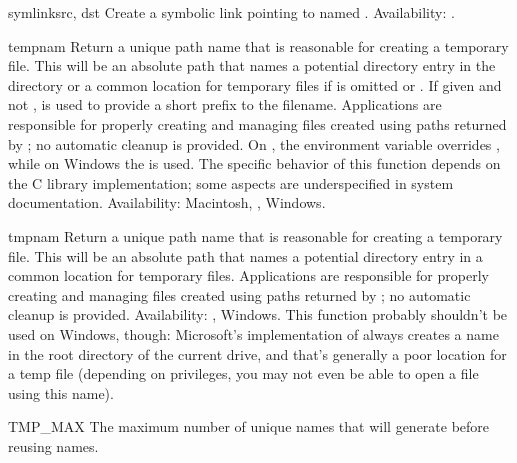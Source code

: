 \begin{funcdesc}{symlink}{src, dst}
Create a symbolic link pointing to  named .
Availability: \UNIX.
\end{funcdesc}

\begin{funcdesc}{tempnam}{}
Return a unique path name that is reasonable for creating a temporary
file.  This will be an absolute path that names a potential directory
entry in the directory  or a common location for temporary
files if  is omitted or .  If given and not
,  is used to provide a short prefix to the
filename.  Applications are responsible for properly creating and
managing files created using paths returned by ;
no automatic cleanup is provided.
On \UNIX, the environment variable  overrides
, while on Windows the  is used.  The specific
behavior of this function depends on the C library implementation;
some aspects are underspecified in system documentation.
Availability: Macintosh, \UNIX, Windows.
\end{funcdesc}

\begin{funcdesc}{tmpnam}{}
Return a unique path name that is reasonable for creating a temporary
file.  This will be an absolute path that names a potential directory
entry in a common location for temporary files.  Applications are
responsible for properly creating and managing files created using
paths returned by ; no automatic cleanup is
provided.
Availability: \UNIX, Windows.  This function probably shouldn't be used
on Windows, though:  Microsoft's implementation of 
always creates a name in the root directory of the current drive, and
that's generally a poor location for a temp file (depending on
privileges, you may not even be able to open a file using this name).
\end{funcdesc}

\begin{datadesc}{TMP_MAX}
The maximum number of unique names that  will
generate before reusing names.
\end{datadesc}

